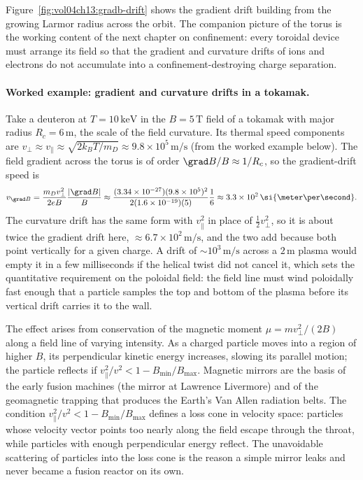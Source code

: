 Figure~\ref{fig:vol04ch13:gradb-drift} shows the gradient drift building from
the growing Larmor radius across the orbit. The companion picture of the
torus is the working content of the next chapter on confinement: every
toroidal device must arrange its field so that the gradient and curvature
drifts of ions and electrons do not accumulate into a confinement-destroying
charge separation.

\paragraph{Worked example: gradient and curvature drifts in a tokamak.}
Take a deuteron at $T = 10\,\si{\kilo\electronvolt}$ in the $B = 5\,\si{
\tesla}$ field of a tokamak with major radius $R_{c} = 6\,\si{\meter}$, the
scale of the field curvature. Its thermal speed components are $v_{\perp}
\approx v_{\parallel} \approx \sqrt{2k_{B}T/m_{D}} \approx 9.8\times
10^{5}\,\si{\meter\per\second}$ (from the worked example below). The field
gradient across the torus is of order $\grad B/B \approx 1/R_{c}$, so the
gradient-drift speed is
\[
v_{\grad B} = \frac{m_{D}v_{\perp}^{2}}{2eB}\frac{|\grad B|}{B}
\approx \frac{(3.34\times 10^{-27})(9.8\times 10^{5})^{2}}
{2(1.6\times 10^{-19})(5)}\frac{1}{6}
\approx 3.3\times 10^{2}\,\si{\meter\per\second}.
\]
The curvature drift has the same form with $v_{\parallel}^{2}$ in place of
$\tfrac12 v_{\perp}^{2}$, so it is about twice the gradient drift here,
$\approx 6.7\times 10^{2}\,\si{\meter\per\second}$, and the two add because
both point vertically for a given charge. A drift of $\sim 10^{3}\,\si{
\meter\per\second}$ across a $2\,\si{\meter}$ plasma would empty it in a few
milliseconds if the helical twist did not cancel it, which sets the
quantitative requirement on the poloidal field: the field line must wind
poloidally fast enough that a particle samples the top and bottom of the
plasma before its vertical drift carries it to the wall.

The  effect arises from conservation of the
magnetic moment $\mu = mv_{\perp}^{2}/(2B)$ along a field line of
varying intensity. As a charged particle moves into a region of
higher $B$, its perpendicular kinetic energy increases, slowing its
parallel motion; the particle reflects if $v_{\parallel}^{2}/v^{2} <
1 - B_{\min}/B_{\max}$. Magnetic mirrors are the basis of the early
fusion machines (the mirror at Lawrence Livermore) and of the
geomagnetic trapping that produces the Earth's Van Allen radiation
belts. The condition $v_{\parallel}^{2}/v^{2} < 1 - B_{\min}/B_{\max}$
defines a loss cone in velocity space: particles whose velocity vector
points too nearly along the field escape through the throat, while
particles with enough perpendicular energy reflect. The unavoidable
scattering of particles into the loss cone is the reason a simple mirror
leaks and never became a fusion reactor on its own.

